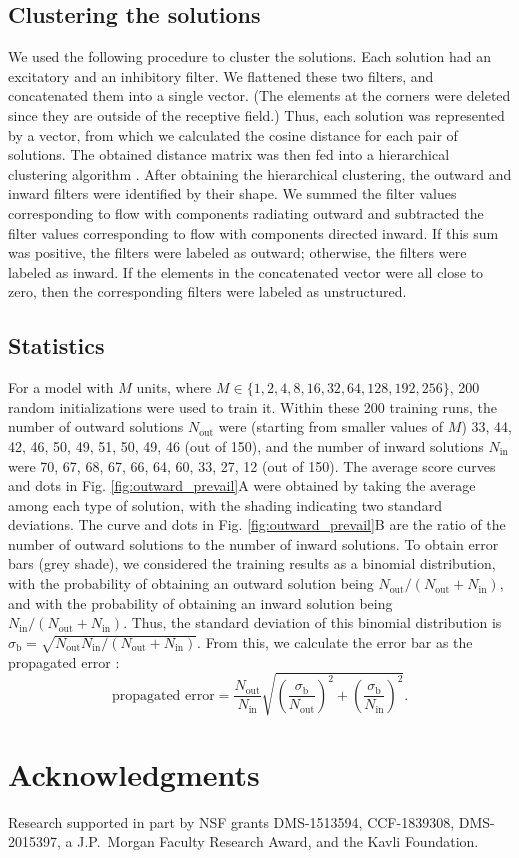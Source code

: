 \documentclass[pdftex,9pt,lineno]{elife}
\begin{document}
\subsection{Clustering the solutions}
We used the following procedure to cluster the solutions. Each solution had an excitatory and an inhibitory filter. We flattened these two filters, and concatenated them into a single vector. (The elements at the corners were deleted since they are outside of the receptive field.) Thus, each solution was represented by a vector, from which we calculated the cosine distance for each pair of solutions. The obtained distance matrix was then fed into a hierarchical clustering algorithm \citep{2020SciPy-NMeth}. After obtaining the hierarchical clustering, the outward and inward filters were identified by their shape. We summed the filter values corresponding to flow with components radiating outward and subtracted the filter values corresponding to flow with components directed inward. If this sum was positive, the filters were labeled as outward; otherwise, the filters were labeled as inward. If the elements in the concatenated vector were all close to zero, then the corresponding filters were labeled as unstructured.

\subsection{Statistics}
For a model with $M$ units, where $M \in \{1,2,4,8,16,32,64,128,192,256\}$, 200 random initializations were used to train it. Within these 200 training runs, the number of outward solutions $N_{\text{out}}$ were (starting from smaller values of $M$) 33, 44, 42, 46, 50, 49, 51, 50, 49, 46 (out of 150), and the number of inward solutions $N_{\text{in}}$ were 70, 67, 68, 67, 66, 64, 60, 33, 27, 12 (out of 150). The average score curves and dots in Fig. \ref{fig:outward_prevail}A were obtained by taking the average among each type of solution, with the shading indicating two standard deviations. The curve and dots in Fig. \ref{fig:outward_prevail}B are the ratio of the number of outward solutions to the number of inward solutions. To obtain error bars (grey shade), we considered the training results as a binomial distribution, with the probability of obtaining an outward solution being $N_{\text{out}}/(N_{\text{out}}+N_{\text{in}})$, and with the probability 
of obtaining an inward 
solution being $N_{\text{in}}/(N_{\text{out}}+N_{\text{in}})$. Thus, the standard deviation of this binomial distribution is $\sigma_{\text{b}}=\sqrt{N_{\text{out}}N_{\text{in}}/(N_{\text{out}}+N_{\text{in}})}$.  From this, we calculate the error bar as the propagated error \citep{caldwell2015propagation}:
\begin{equation}
\text{propagated error} = \frac{N_{\text{out}}}{N_{\text{in}}}\sqrt{\left(\frac{\sigma_{\text{b}}}{N_{\text{out}}}\right)^{2}+\left(\frac{\sigma_{\text{b}}}{N_{\text{in}}}\right)^{2}}.
\end{equation}




\section{Acknowledgments}

Research supported in part by NSF grants DMS-1513594, CCF-1839308, DMS-2015397, a  J.P.~Morgan Faculty Research Award, and the Kavli Foundation.


\end{document}
